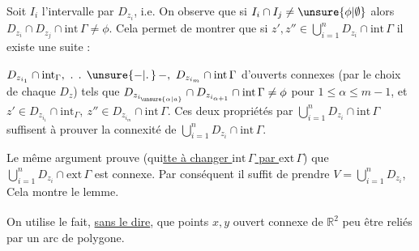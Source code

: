 Soit $I_{i}$ l'intervalle   par $D_{z_{i}}$, i.e.  On observe que si $I_{i}\cap I_{j}\ne\unsure{\phi|\emptyset}$ alors $D_{z_{i}}\cap D_{z_{j}}\cap\mathrm{int}\,\Gamma\ne\phi$. Cela permet de montrer que si $z',z''\in\bigcup\limits_{i=1}^{n}D_{z_{i}}\cap\mathrm{int}\,\Gamma$ il existe une suite :

$D_{z_{i_{1}}}\cap\mathrm{int}_{\Gamma},\ \ldotp\;\ldotp\;\unsure{-|\ldotp}\,{-},\ D_{z_{i_{m}}}\cap\mathrm{int}\,\Gamma$ d'ouverts connexes (par le choix de chaque $D_{z}$) tels que $D_{z_{i_{\unsure{\alpha|a}}}}\cap D_{z_{i_{\alpha+1}}}\cap\mathrm{int}\,\Gamma\ne\phi$ pour $1\le\alpha\le m-1$, et $z'\in D_{z_{i_{1}}}\cap\mathrm{int}_{\Gamma},\ z''\in D_{z_{i_{m}}}\cap\mathrm{int}\,\Gamma$. Ces deux propriétés  par $\bigcup\limits_{i=1}^{n}D_{z_{i}}\cap\mathrm{int}\,\Gamma$ suffisent à prouver la connexité de $\bigcup\limits_{i=1}^{n}D_{z_{i}}\cap\mathrm{int}\,\Gamma$.

\margin{!\ $\cdot$} Le même argument prouve (qui\uline{tte à changer $\mathrm{int}\,\Gamma$ par $\mathrm{ext}\,\Gamma$}) que $\bigcup\limits_{i=1}^{n}D_{z_{i}}\cap\mathrm{ext}\,\Gamma$ est connexe. Par conséquent il suffit de prendre $V=\bigcup\limits_{i=1}^{n}D_{z_{i}}$, Cela montre le lemme.

On\textsuperscript{\unsure{$*$}} utilise le fait, \uline{sans le dire}, que   points $x,y$   ouvert connexe de $\mathbb{R}^{2}$ peu être reliés par un arc de polygone.


